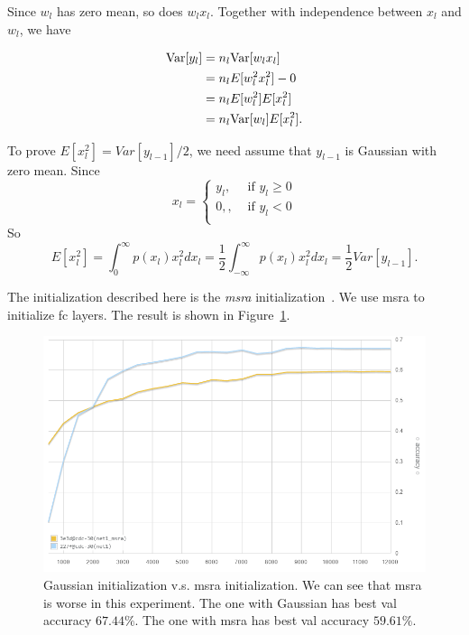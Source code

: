 Since $w_l$ has zero mean,
so does $w_l x_l$.
Together with independence between $x_l$ and $w_l$,
we have

\begin{equation}
\begin{split}
    {\mathop{\mathrm{Var}}}[y_l] &= n_l {\mathop{\mathrm{Var}}}[w_l x_l] \\
        &=n_l E[w_l^2 x_l^2] - 0 \\
        &=n_l E[w_l^2] E[x_l^2] \\
        &=n_l {\mathop{\mathrm{Var}}}[w_l] E[x_l^2].
\end{split}
\end{equation}

To prove $E[x_l^2]=Var[y_{l-1}]/2$,
we need assume that $y_{l-1}$ is Gaussian with zero mean.
Since
\begin{equation}
    x_l = \begin{cases}
        y_l, &\text{ if }y_l\ge0\\
        0, , &\text{ if }y_l<0\\
    \end{cases}
\end{equation}
So
\begin{equation}
    E[x_l^2] = \int_0^\infty p(x_l)x_l^2 dx_l
        = \frac{1}{2}\int_{-\infty}^\infty p(x_l)x_l^2 dx_l
        = \frac{1}{2}Var[y_{l-1}].
\end{equation}

The initialization described here is the \emph{msra} initialization~\cite{he2015delving}.
We use msra to initialize fc layers.
The result is shown in Figure~\ref{fig:msra}.

\begin{figure}[ht]
\centering
    \includegraphics[width=0.9\linewidth]{fig/msra}
    \caption{\small
    Gaussian initialization v.s. msra initialization.
    We can see that msra is worse in this experiment.
    The one with Gaussian has best val accuracy $67.44\%$.
    The one with msra has best val accuracy $59.61\%$.}
    \label{fig:msra}
\end{figure}

